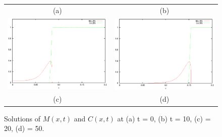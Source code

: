\documentclass{report}
\begin{document}
\begin{figure}[h!tb]
\begin{center}
\begin{tabular}{c c}
      (a) & (b) \\
      \includegraphics[scale=0.55]{solution_t20.eps} &
      \includegraphics[scale=0.55]{solution_t50.eps} \\
      (c) & (d) 
  \end{tabular}
  \caption{Solutions of $M(x,t)$ and $C(x,t)$ at (a) t = 0, (b) t = 10, (c) = 20, (d) = 50. }
  \label{fig:solution}
\end{center}
\end{figure}
\end{document}

